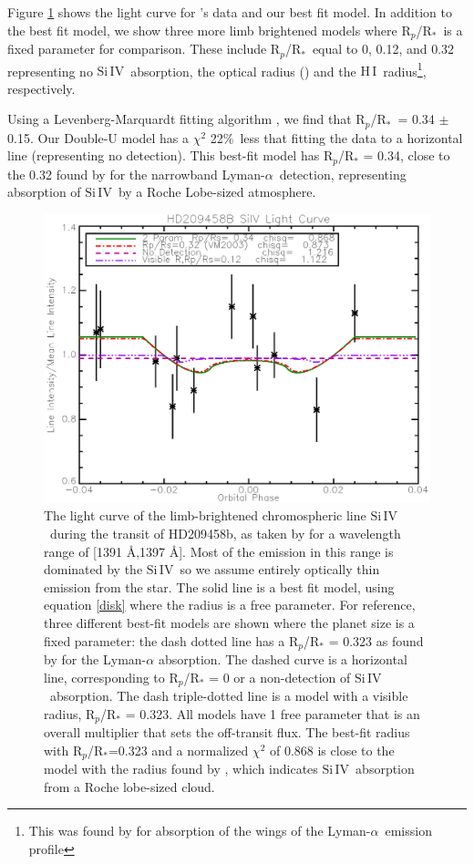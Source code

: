 \documentclass[manuscript]{aastex}
\newcommand{\hi}{\ensuremath{\mathrm{H}\,\scriptstyle \mathrm{I}}}
\newcommand{\siIV}{\ensuremath{\mathrm{Si}\,\scriptstyle \mathrm{IV}}}
\newcommand{\p}{R$_p$/R$_*$}
\newcommand{\lya}{Lyman-$\alpha$}
\begin{document}
Figure \ref{lightc} shows the light curve for \citet{vidmad}'s data and our best fit model. In addition to the best fit model, we show three more limb brightened models where \p\ is a fixed parameter for comparison. These include \p\ equal to 0, 0.12, and 0.32 representing no \siIV\ absorption, the optical radius (\citep{knutsonprop}) and the \hi\ radius\footnote{This was found by \citet{vidmad} for absorption of the wings of the \lya\ emission profile}, respectively.

Using a Levenberg-Marquardt fitting algorithm \citep{mpfit}, we find that \p\ = 0.34 $\pm$ 0.15. 
Our Double-U model has a $\chi^2$  22\%\ less that fitting the data to
a horizontal line (representing no detection). This best-fit model has
R$_p$/R$_*$ = 0.34, close to the 0.32 found by \citet{vidmad} for the narrowband \lya\ detection, representing absorption of \siIV\ by a Roche Lobe-sized atmosphere.


\begin{figure}[!ht]
\begin{center}
\includegraphics[width=0.5 \textwidth]{hd209458.eps}
\caption{The light curve of the limb-brightened chromospheric line \siIV\ during the transit of HD209458b, as taken by \citet{vidmad} for a wavelength range of [1391 \AA,1397 \AA]. Most of the emission in this range is dominated by the \siIV\, so we assume entirely optically thin emission from the star. The solid line is a best fit model, using equation \ref{disk} where the radius is a free parameter. For reference, three different best-fit models are shown where the planet size is a fixed parameter: the dash dotted line has a R$_p$/R$_*$ = 0.323 as found by \citet{vidmad} for the Lyman-$\alpha$ absorption. The dashed curve is a horizontal line, corresponding to R$_p$/R$_*$ = 0 or a non-detection of \siIV\ absorption. The dash triple-dotted line is a model with a visible radius, R$_p$/R$_*$ = 0.323. All models have 1 free parameter that is an overall multiplier that sets the off-transit flux. The best-fit radius with R$_p$/R$_*$=0.323 and a normalized $\chi^2$ of 0.868 is close to the model with the radius found by \citet{vidmad}, which indicates \siIV\ absorption from a Roche lobe-sized cloud. }
\end{center}
\label{lightc}
\end{figure}
\end{document}
